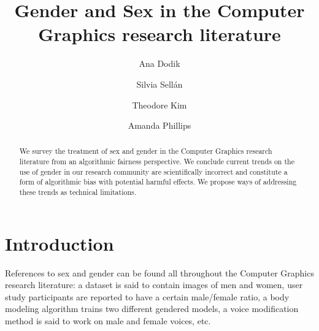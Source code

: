 \documentclass[nonacm,sigconf,review,balance=false]{acmart}
\begin{document}
\title{Gender and Sex in the Computer Graphics research literature}

\author{Ana Dodik}

\author{Silvia Sellán}\authornotemark[1]

\author{Theodore Kim}

\author{Amanda Phillips}



\begin{abstract}
    We survey the treatment of sex and gender in the Computer Graphics research
    literature from an algorithmic fairness perspective. We conclude
    current trends on the use of gender in our research community are scientifically incorrect and constitute a
    form of algorithmic bias with potential harmful effects. We propose ways of addressing these trends as technical limitations.
\end{abstract}


\maketitle

\vspace{-0.1cm}
\section{Introduction}

References to sex and gender can be found all throughout the Computer Graphics research literature: a dataset is said to contain images of men and women, user study participants are reported to have a certain male/female ratio, a body modeling algorithm trains two different gendered models, a voice modification method is said to work on male and female voices, etc.
\end{document}
